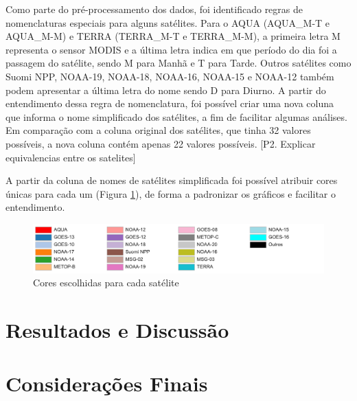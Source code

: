 \documentclass[cic,tc]{iiufrgs}
\begin{document}
Como parte do pré-processamento dos dados, foi identificado regras de nomenclaturas 
especiais para alguns satélites. Para o AQUA (AQUA\_M-T e AQUA\_M-M) e TERRA 
(TERRA\_M-T e TERRA\_M-M), a primeira letra M representa o sensor MODIS e a última
letra indica em que período do dia foi a passagem do satélite, sendo M para Manhã 
e T para Tarde. Outros satélites como Suomi NPP, NOAA-19, NOAA-18, NOAA-16, NOAA-15 
e NOAA-12 também podem apresentar a última letra do nome sendo D para Diurno.
A partir do entendimento dessa regra de nomenclatura, foi possível criar uma nova 
coluna que informa o nome simplificado dos satélites, a fim de facilitar 
algumas análises. Em comparação com a coluna original dos satélites, que tinha 32 
valores possíveis, a nova coluna contém apenas 22 valores possíveis.
[P2. Explicar equivalencias entre os satelites] \par

A partir da coluna de nomes de satélites simplificada foi possível atribuir cores 
únicas para cada um (Figura \ref{fig:cores_satelites}), de forma a padronizar os 
gráficos e facilitar o entendimento.

\begin{figure}[H]
    \caption{Cores escolhidas para cada satélite}
    \begin{center}
        \includegraphics[width=35em]{cores_satelites}
    \end{center}
    \label{fig:cores_satelites}
\end{figure}




\chapter{Resultados e Discussão}



\chapter{Considerações Finais}





\end{document}
